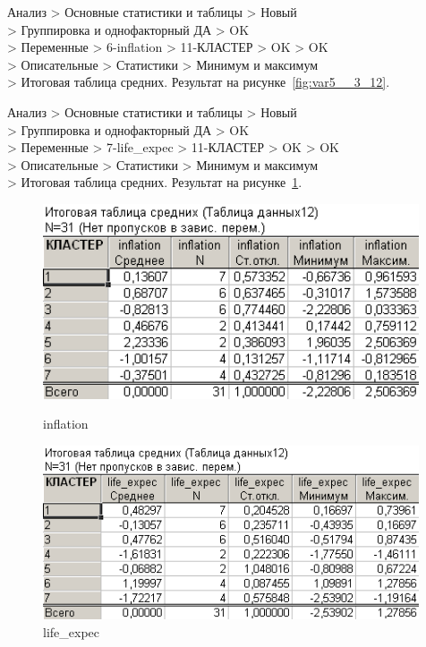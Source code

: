 \newpage

Анализ > Основные статистики и таблицы > Новый\\
> Группировка и однофакторный ДА > OK\\
> Переменные > 6-inflation > 11-КЛАСТЕР > OK > OK\\
> Описательные > Статистики > Минимум и максимум\\
> Итоговая таблица средних. Результат на рисунке~\ref{fig:var5__3_12}.

Анализ > Основные статистики и таблицы > Новый\\
> Группировка и однофакторный ДА > OK\\
> Переменные > 7-life\_expec > 11-КЛАСТЕР > OK > OK\\
> Описательные > Статистики > Минимум и максимум\\
> Итоговая таблица средних. Результат на рисунке~\ref{fig:var5__3_13}.

\begin{figure}[!h]
  \centering
  \begin{minipage}{0.49\textwidth}
    \centering

    \includegraphics[width=0.99\textwidth]
    {inc/cars_my/var5__3_12.PNG}

    \caption{inflation}
    \label{fig:var5__3_12}
  \end{minipage}
  \begin{minipage}{0.49\textwidth}
    \centering

    \includegraphics[width=0.99\textwidth]
    {inc/cars_my/var5__3_13.PNG}

    \caption{life\_expec}
    \label{fig:var5__3_13}
  \end{minipage}
\end{figure}

